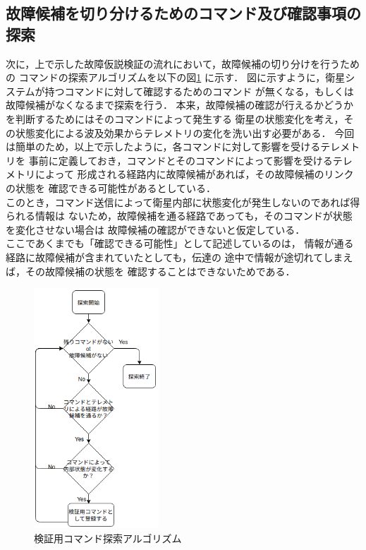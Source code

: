 \documentclass[11pt]{jsreport}
\begin{document}
\newpage
\subsection{故障候補を切り分けるためのコマンド及び確認事項の探索}
次に，上で示した故障仮説検証の流れにおいて，故障候補の切り分けを行うための
コマンドの探索アルゴリズムを以下の図\ref{fig:veri_COM_algorithm}
に示す．
図に示すように，衛星システムが持つコマンドに対して確認するためのコマンド
が無くなる，もしくは故障候補がなくなるまで探索を行う．
本来，故障候補の確認が行えるかどうかを判断するためにはそのコマンドによって発生する
衛星の状態変化を考え，その状態変化による波及効果からテレメトリの変化を洗い出す必要がある．
今回は簡単のため，以上で示したように，各コマンドに対して影響を受けるテレメトリを
事前に定義しておき，コマンドとそのコマンドによって影響を受けるテレメトリによって
形成される経路内に故障候補があれば，その故障候補のリンクの状態を
確認できる可能性があるとしている．\\
このとき，コマンド送信によって衛星内部に状態変化が発生しないのであれば得られる情報は
ないため，故障候補を通る経路であっても，そのコマンドが状態を変化させない場合は
故障候補の確認ができないと仮定している．\\
ここであくまでも「確認できる可能性」として記述しているのは，
情報が通る経路に故障候補が含まれていたとしても，伝達の
途中で情報が途切れてしまえば，その故障候補の状態を
確認することはできないためである．

\begin{figure}[H]
   \centering
      \includegraphics[height=9.0cm]{figure/veri_COM_search.png}
      \caption{検証用コマンド探索アルゴリズム}
      \label{fig:veri_COM_algorithm}
\end{figure}
\end{document}
